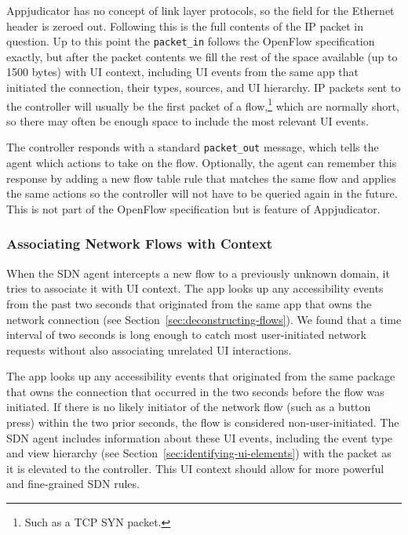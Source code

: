 Appjudicator has no concept of link layer protocols, so the field for the
Ethernet header is zeroed out. Following this is the full contents of the IP
packet in question. Up to this point the \texttt{packet\_in} follows the
OpenFlow specification exactly, but after the packet contents we fill the rest
of the space available (up to 1500 bytes) with UI context, including UI events
from the same app that initiated the connection, their types, sources, and UI
hierarchy. IP packets sent to the controller will usually be the first packet of
a flow,\footnote{Such as a TCP SYN packet.} which are normally short, so
there may often be enough space to include the most relevant UI events.

The controller responds with a standard \texttt{packet\_out} message, which
tells the agent which actions to take on the flow. Optionally, the agent can
remember this response by adding a new flow table rule that matches the same
flow and applies the same actions so the controller will not have to be queried
again in the future. This is not part of the OpenFlow specification but is
feature of Appjudicator.

\subsubsection{Associating Network Flows with Context}
\label{sec:associating-network-flows-with-context}

When the SDN agent intercepts a new flow to a previously unknown domain, it
tries to associate it with UI context. The app looks up any accessibility events
from the past two seconds that originated from the same app that owns the
network connection (see Section~\ref{sec:deconstructing-flows}). We found that a
time interval of two seconds is long enough to catch most user-initiated network
requests without also associating unrelated UI interactions.

The app looks up any accessibility events that originated from the same package
that owns the connection that occurred in the two seconds before the flow was
initiated. If there is no likely initiator of the network flow (such as a button
press) within the two prior seconds, the flow is considered non-user-initiated.
The SDN agent includes information about these UI events, including the event
type and view hierarchy (see Section~\ref{sec:identifying-ui-elements}) with the
packet as it is elevated to the controller. This UI context should allow for
more powerful and fine-grained SDN rules.

